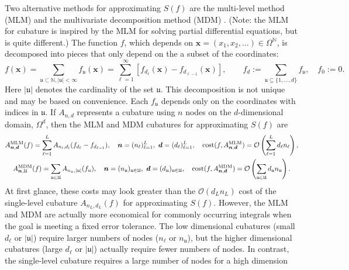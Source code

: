 \documentclass[11pt]{NSFamsart}
\DeclareMathOperator{\cost}{cost}
\newcommand{\naturals}{{\mathbb{N}}}
\newcommand{\fu}{\mathfrak{u}}
\newcommand{\bd}{{\boldsymbol{d}}}
\newcommand{\bx}{{\boldsymbol{x}}}
\newcommand{\bn}{{\boldsymbol{n}}}
\newcommand{\fU}{\mathfrak{U}}
\def\abs#1{\ensuremath{\left \lvert #1 \right \rvert}}
\newcommand{\Order}{\mathcal{O}}
\begin{document}
Two alternative methods for approximating $S(f)$ are the multi-level method (MLM) \cite{Gil15a} 
and the 
multivariate 
decomposition method (MDM) \cite{Was13b}.  (Note: the MLM for cubature is inspired by the MLM 
for solving partial differential equations, but is quite different.) The function $f$, which depends on 
$\bx=(x_1, x_2, 
\ldots) \in 
\Omega^\naturals$, 
is decomposed into pieces that only depend on the a subset of the coordinates:  
\begin{equation*}
f(\bx) = \sum_{\fu \subset \naturals, \abs{\fu} < \infty} f_{\fu}(\bx) = \sum_{\ell 
=1}^\infty [f_{d_\ell}(\bx) - f_{d_{\ell-1}}(\bx)], \qquad  f_d:= \sum_{\fu \subseteq \{1, 
\ldots, d\}} f_\fu, \quad f_0:= 0.
\end{equation*}
Here $\abs{\fu}$ denotes the cardinality of the set $\fu$.  This decomposition is not unique and may 
be based on convenience.  Each $f_{\fu}$ depends 
only 
on the coordinates with indices in $\fu$.  If $A_{n,d}$ represents a cubature 
using $n$ nodes on the $d$-dimensional domain, $\Omega^d$, then the MLM and MDM cubatures 
for 
approximating $S(f)$ are \cite{Gil15a, Was13b}
\begin{gather*}
A^{\textup{MLM}}_{\bn,\bd}(f) = \sum_{\ell=1}^L A_{n_l,d_l}(f_{d_\ell} - f_{d_{\ell-1}}), \quad \bn = 
(n_\ell)_{\ell = 1}^L, \ \bd = 
(d_\ell)_{\ell = 1}^L, \quad \cost(f,A^{\textup{MLM}}_{\bn,\bd}) = \Order\left (\sum_{\ell=1}^L d_\ell 
n_\ell \right), \\
A^{\textup{MDM}}_{\bn,\fU}(f) = \sum_{\fu \in \fU} A_{n_{\fu},\abs{\fu}}(f_{u}), \quad \bn = 
(n_\fu)_{\fu \in \fU}, \ \bd = 
(d_\fu)_{\fu \in \fU}, \quad \cost(f,A^{\textup{MDM}}_{\bn,\bd}) = \Order\left (\sum_{\fu \in \fU} d_\fu 
n_\fu\right).
\end{gather*}
At first glance, these costs may look greater than the $\Order(d_L n_L)$ cost of the single-level 
cubature 
$A_{n_L,d_L}(f)$ for approximating $S(f)$.  However, the MLM and MDM are actually more 
economical for commonly occurring integrals when the goal is meeting a fixed error tolerance.   The 
low dimensional cubatures (small $d_\ell$ or $\abs{\fu}$) require 
larger numbers of nodes ($n_\ell$ or $n_{\fu}$),  
but the higher dimensional cubatures (large $d_\ell$ or $\abs{\fu}$) actually require fewer numbers 
of nodes.  In contrast, the single-level cubature requires a large number of nodes for a high 
dimension
\end{document}
